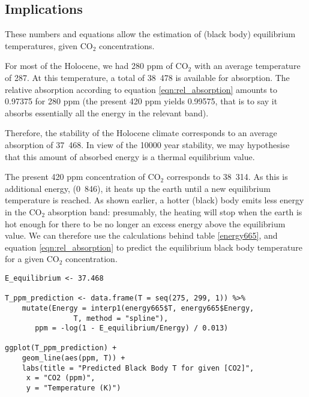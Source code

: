 \documentclass[10pt,a4paper,titlepage]{article}
\begin{document}
\subsection{Implications}
\label{sec-3-5}
These numbers and equations allow the estimation of (black body)
equilibrium temperatures, given CO$_{\text{2}}$ concentrations.

For most of the Holocene, we had 280 ppm of CO$_{\text{2}}$ with an average
temperature of \unit{287}{\kelvin}. At this temperature, a total of
\unit{38.478}{\watt\per\metre\squared} is available for absorption. The
relative absorption according to equation \ref{eqn:rel_absorption}
amounts to 0.97375 for 280 ppm (the present 420 ppm yields 0.99575,
that is to say it absorbs essentially all the energy in the relevant band).

Therefore, the stability of the Holocene climate corresponds to an
average absorption of \unit{37.468}{\watt\per\metre\squared}. In view
of the 10000 year stability, we may hypothesise that this amount of
absorbed energy is a thermal equilibrium value.

The present 420 ppm concentration of CO$_{\text{2}}$ corresponds to
\unit{38.314}{\watt\per\metre\squared}. As this is additional energy,
(\unit{0.846}{\watt\per\metre\squared}), it heats up the earth until a
new equilibrium temperature is reached. As shown earlier, a hotter
(black) body emits less energy in the CO$_{\text{2}}$ absorption band:
presumably, the heating will stop when the earth is hot enough for
there to be no longer an excess energy above the equilibrium value. We
can therefore use the calculations behind table \ref{energy665}, and
equation \ref{eqn:rel_absorption} to predict the equilibrium black
body temperature for a given CO$_{\text{2}}$ concentration.

\begin{lstlisting}
E_equilibrium <- 37.468

T_ppm_prediction <- data.frame(T = seq(275, 299, 1)) %>%
    mutate(Energy = interp1(energy665$T, energy665$Energy,
			    T, method = "spline"),
	   ppm = -log(1 - E_equilibrium/Energy) / 0.013)

ggplot(T_ppm_prediction) +
    geom_line(aes(ppm, T)) +
    labs(title = "Predicted Black Body T for given [CO2]",
	 x = "CO2 (ppm)",
	 y = "Temperature (K)")
\end{lstlisting}
\end{document}

